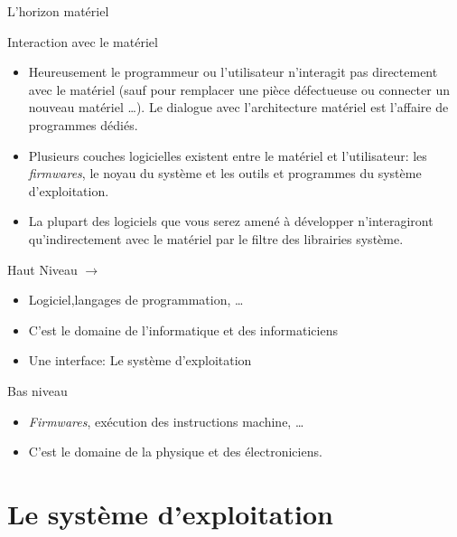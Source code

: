 


\begin{frame}{L'horizon matériel}
  \begin{block}{Interaction avec le matériel}
    \begin{itemize}
    \item Heureusement le programmeur ou l'utilisateur n'interagit pas
      directement avec le matériel (sauf pour remplacer une pièce
      défectueuse ou connecter un nouveau matériel \dots). Le dialogue
      avec l'architecture matériel est l'affaire de programmes dédiés.
    \item Plusieurs couches logicielles existent entre le matériel et
      l'utilisateur: les \textit{firmwares}, le noyau du système et les
      outils et programmes du système d'exploitation.
    \item La plupart des logiciels que vous serez amené à développer
      n'interagiront qu'indirectement avec le matériel par le filtre des
      librairies système.
    \end{itemize}
  \end{block}
  \begin{alertblock}{Haut Niveau $\rightarrow$}
    \begin{itemize}
    \item Logiciel,langages de programmation, \dots
    \item[\dialoginformation] C'est le domaine de l'informatique et des informaticiens
    \item[\dialogsystem] Une interface: Le système d'exploitation
    \end{itemize}
  \end{alertblock}
  \begin{alertblock}{Bas niveau}
    \begin{itemize}
    \item \textit{Firmwares}, exécution des instructions machine,
      \dots
    \item C'est le domaine de la physique et des électroniciens.
    \end{itemize}
  \end{alertblock}
\end{frame}

\section{Le système d'exploitation}
\label{sec:OSGeneralites}
